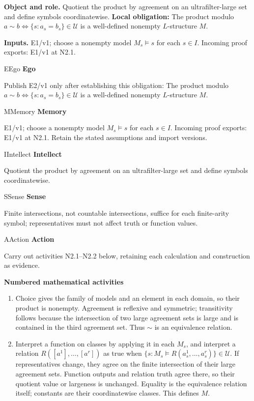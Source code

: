 \documentclass[preprint,12pt,aps,pra,showkeys,amsmath,amssymb,superscriptaddress,floatfix]{revtex4-2}
\theoremstyle{definition}
\theoremstyle{remark}
\newcommand{\mmfaculty}[3]{%
 \begin{mmfacultybox}{#1}{#2}
 {\sffamily\bfseries\color{MMBlue}#2}\par\smallskip #3
 \end{mmfacultybox}}
\newcommand{\field}[2]{\par\smallskip\noindent\textbf{#1.} #2\par}
\begin{document}
\field{Object and role}{Quotient the product by agreement on an ultrafilter-large set and define
symbols coordinatewise. \textbf{Local obligation:} The product modulo
\(a\sim b\iff\{s:a_s=b_s\}\in\mathcal U\) is a well-defined nonempty
\(L\)-structure \(M\).}

\field{Inputs}{E1/v1; choose a nonempty model \(M_s\models s\) for each \(s\in I\).
Incoming proof exports: E1/v1 at N2.1.}

\mmfaculty{E}{Ego}{Publish E2/v1 only after establishing this obligation: The product
modulo \(a\sim b\iff\{s:a_s=b_s\}\in\mathcal U\) is a well-defined
nonempty \(L\)-structure \(M\).}

\mmfaculty{M}{Memory}{E1/v1; choose a nonempty model \(M_s\models s\) for each \(s\in I\).
Incoming proof exports: E1/v1 at N2.1. Retain the stated assumptions and
import versions.}

\mmfaculty{I}{Intellect}{Quotient the product by agreement on an ultrafilter-large set and define
symbols coordinatewise.}

\mmfaculty{S}{Sense}{Finite intersections, not countable intersections, suffice for each
finite-arity symbol; representatives must not affect truth or function
values.}

\mmfaculty{A}{Action}{Carry out activities N2.1--N2.2 below, retaining each calculation and
construction as evidence.}

\smallskip\noindent\textbf{Numbered mathematical activities}

\begin{enumerate}[label=N2.\arabic*,leftmargin=3.4em]

\item Choice gives the family of models and an element in each domain, so
their product is nonempty. Agreement is reflexive and symmetric;
transitivity follows because the intersection of two large agreement
sets is large and is contained in the third agreement set. Thus \(\sim\)
is an equivalence relation.

\item Interpret a function on classes by applying it in each \(M_s\), and
interpret a relation \(R([a^1],\ldots,[a^r])\) as true when
\(\{s:M_s\models R(a_s^1,\ldots,a_s^r)\}\in\mathcal U\). If
representatives change, they agree on the finite intersection of their
large agreement sets. Function outputs and relation truth agree there,
so their quotient value or largeness is unchanged. Equality is the
equivalence relation itself; constants are their coordinatewise classes.
This defines \(M\).

\end{enumerate}
\end{document}
